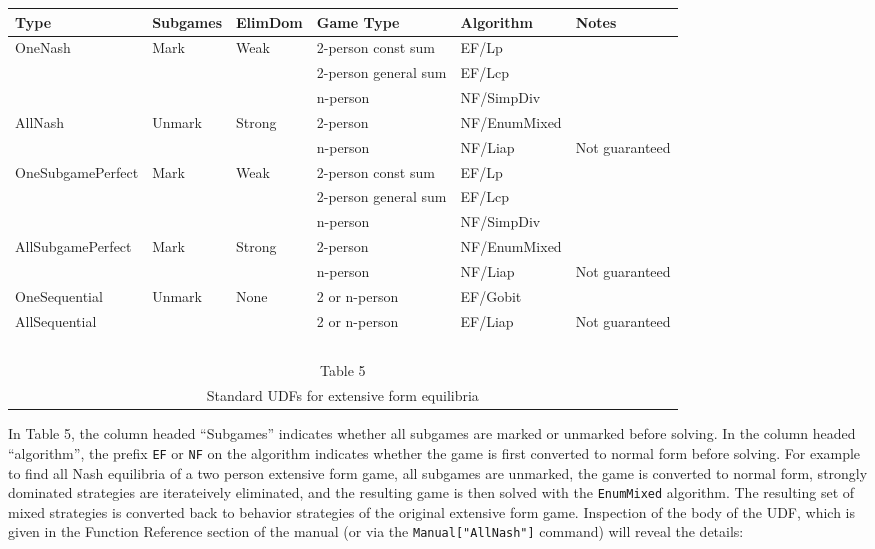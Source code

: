 \medskip
\begin{tabular}{|l|l|l|p{2cm}|l|l|}
Type & Subgames & ElimDom & Game Type & Algorithm & Notes\\
\hline
OneNash & Mark & Weak &  2-person const sum & EF/Lp &\\ \cline{4-6}
        &      &      &  2-person general sum & EF/Lcp &\\ \cline{4-6}
        &      &      &  n-person             & NF/SimpDiv &\\
\hline
AllNash &  Unmark & Strong &  2-person       & NF/EnumMixed &\\ \cline{4-6}
        &         &        &  n-person       & NF/Liap &Not guaranteed\\
\hline
\hline
OneSubgamePerfect &  Mark & Weak &  2-person const sum& EF/Lp &\\ \cline{4-6}
                  &       &      &  2-person general sum & EF/Lcp &\\ \cline{4-6}
                  &       &      &  n-person        & NF/SimpDiv &\\
\hline
AllSubgamePerfect &  Mark & Strong &  2-person    & NF/EnumMixed &\\ \cline{4-6}
                  &       &        &  n-person    & NF/Liap &Not guaranteed\\
\hline
\hline
OneSequential &  Unmark & None &  2 or n-person   & EF/Gobit &\\ \cline{4-6}
\hline
AllSequential &         &       &  2 or n-person   & EF/Liap &Not guaranteed\\
\hline
\multicolumn{6}{c}{\ }\\
\multicolumn{6}{c}{Table 5}\\
\multicolumn{6}{c}{Standard UDFs for extensive form equilibria}\\
\end{tabular}
\medskip

In Table 5, the column headed ``Subgames'' indicates whether all
subgames are marked or unmarked before solving.  In the column headed
``algorithm'', the prefix \verb+EF+ or \verb+NF+ on the algorithm
indicates whether the game is first converted to normal form before
solving.  For example to find all Nash equilibria of a two person
extensive form game, all subgames are unmarked, the game is converted
to normal form, strongly dominated strategies are iterateively
eliminated, and the resulting game is then solved with the
\verb+EnumMixed+ algorithm.  The resulting set of mixed strategies is
converted back to behavior strategies of the original extensive form
game.  Inspection of the body of the UDF, which is given in the
Function Reference section of the manual (or via the
\verb+Manual["AllNash"]+ command) will reveal the details:

